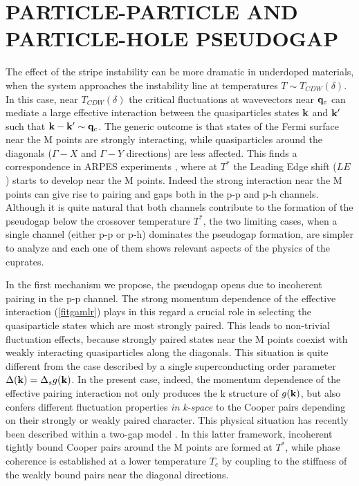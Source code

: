 \documentclass[twoside]{article}
\begin{document}
\section{PARTICLE-PARTICLE AND PAR\-TI\-CLE-HOLE PSEUDOGAP}

The effect of the stripe instability can be more dramatic in underdoped 
materials, when the system approaches the instability line at temperatures 
$T\sim T_{CDW}(\delta)$. In this case, near $T_{CDW}(\delta)$ the critical 
fluctuations at 
wavevectors near ${\bf q}_c$ can mediate a large effective interaction 
between the quasiparticles states ${\bf k}$ and ${\bf k'}$ 
such that ${\bf k}-{\bf k'}\sim {\bf q}_c$. The generic outcome is that 
states of the Fermi surface near the M points are strongly interacting, while 
quasiparticles around the diagonals ($\Gamma-X$ and $\Gamma-Y$ directions) 
are less affected. This finds a correspondence in ARPES experiments 
\cite{marshall,ding}, where at $T^*$ the Leading Edge shift ($LE$) starts to 
develop near the M points. Indeed the strong interaction near the M points 
can give rise to pairing and gaps both in the p-p and  p-h channels. Although 
it is quite natural that both channels contribute to the formation of the 
pseudogap below 
the crossover temperature $T^*$, the two limiting cases, when a single 
channel (either p-p or p-h) dominates the pseudogap formation, are simpler to 
analyze and each one of them shows relevant aspects of the physics of the 
cuprates.

In the first mechanism we propose, the pseudogap opens due to incoherent 
pairing in the p-p channel. The strong momentum dependence of the effective 
interaction (\ref{fitgamlr}) plays in this regard a crucial role in selecting 
the quasiparticle states which are most strongly paired. This leads to 
non-trivial fluctuation effects, because strongly paired states near the M 
points coexist with weakly interacting quasiparticles along the diagonals. 
This situation is quite different from the case described by a single 
superconducting order parameter $\Delta ({\bf k})=\Delta_s g({\bf k})$. In 
the present case, indeed, the momentum dependence of the effective pairing 
interaction  not only produces the k structure of $g({\bf k})$, but also 
confers different fluctuation properties  {\em in k-space} to the Cooper 
pairs depending on their strongly or weakly paired character. This physical 
situation has recently been described within a two-gap model \cite{twogap}. 
In this latter framework, incoherent tightly bound Cooper pairs around the M 
points are formed at $T^*$, while phase coherence is established at a lower 
temperature $T_c$ by coupling to the stiffness of the weakly bound pairs near 
the diagonal directions.
\end{document}
